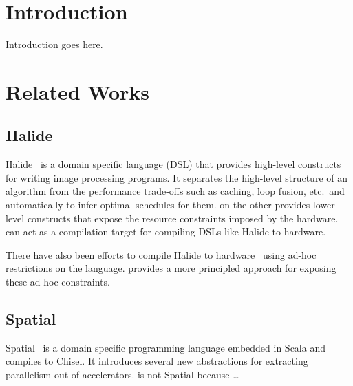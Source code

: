 \documentclass[acmsmall,review,anonymous]{acmart}\settopmatter{printfolios=true,printccs=false,printacmref=false}
\begin{document}


\maketitle

\section{Introduction}
Introduction goes here.


\section{Related Works}

\subsection{Halide}
Halide~\cite{halide} is a domain specific language (DSL) that provides high-level constructs for writing image processing
programs. It separates the high-level structure of an algorithm from the
performance trade-offs such as caching, loop fusion, etc.\ and automatically to
infer optimal schedules for them. \sys{} on the other provides lower-level constructs
that expose the resource constraints imposed by the hardware. \sys{} can act as a
compilation target for compiling DSLs like Halide to hardware.

There have also been efforts to compile Halide to hardware~\cite{halide-hls} using ad-hoc
restrictions on the language. \sys{} provides a more principled approach for
exposing these ad-hoc constraints.

\subsection{Spatial}
Spatial~\cite{spatial} is a domain specific programming language embedded in Scala
and compiles to Chisel. It introduces several new abstractions for extracting
parallelism out of accelerators. \sys{} is not Spatial because \ldots
\end{document}
